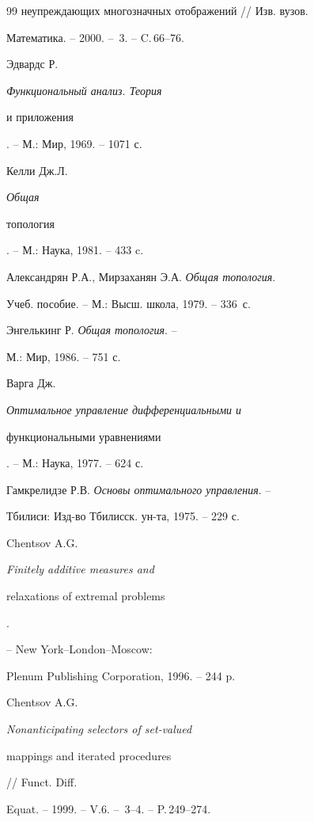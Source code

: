 \begin{thebibliography}{99}
{неупреждающих многозначных отображений} // Изв. вузов.


Математика. -- 2000. -- \No\,3. -- C.\,66--76.





 Эдвардс Р. {\em Функциональный анализ. Теория


и приложения}. -- М.: Мир, 1969. -- 1071 с.





 Келли Дж.Л. {\em Общая


топология}. -- М.: Наука, 1981. -- 433 c.





 Александрян Р.А., Мирзаханян Э.А. {\em Общая топология}.


Учеб. пособие. -- М.: Высш. школа, 1979. -- 336~с.





 Энгелькинг Р. {\em Общая топология}. --


М.: Мир, 1986. -- 751 с.





 Варга Дж. {\em Оптимальное управление дифференциальными и


функциональными уравнениями}. -- М.: Наука, 1977. -- 624 с.





 Гамкрелидзе Р.В. {\em Основы оптимального управления}. --


Тбилиси: Изд-во Тбилисск. ун-та, 1975. -- 229 с.





 Chentsov A.G. {\em Finitely additive measures and


relaxations of extremal problems}.


-- New York--London--Moscow:


Plenum Publishing Corporation, 1996. -- 244 p.





 Chentsov A.G. {\em Nonanticipating selectors of set-valued


mappings and iterated procedures} // Funct. Diff.


Equat. -- 1999. -- V.6. -- \No\,3--4. -- P.\,249--274.






\end{thebibliography}
